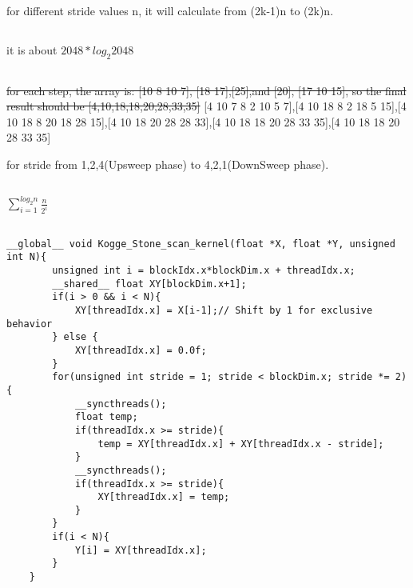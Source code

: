 \documentclass{article}
\begin{document}
\subsection{}
for different stride values n, it will calculate from (2k-1)n to (2k)n.

\subsection{}
it is about $2048*log_{2}2048$

\subsection{}
\sout{for each step, the array is: [10 8 10 7], [18 17],[25],and [20], [17 10 15], so the final result should be [4,10,18,18,20,28,33,35]}
[4 10 7 8 2 10 5 7],[4 10 18 8 2 18 5 15],[4 10 18 8 20 18 28 15],[4 10 18 20 28 28 33],[4 10 18 18 20 28 33 35],[4 10 18 18 20 28 33 35]

for stride from 1,2,4(Upsweep phase) to 4,2,1(DownSweep phase).

\subsection{}
\(\sum_{i=1}^{log_{2}n}\frac{n}{2^{i}}\)

\subsection{}
\begin{lstlisting}[basicstyle=\small\ttfamily, breaklines=true]
    __global__ void Kogge_Stone_scan_kernel(float *X, float *Y, unsigned int N){
        unsigned int i = blockIdx.x*blockDim.x + threadIdx.x;
        __shared__ float XY[blockDim.x+1];
        if(i > 0 && i < N){
            XY[threadIdx.x] = X[i-1];// Shift by 1 for exclusive behavior
        } else {
            XY[threadIdx.x] = 0.0f;
        }
        for(unsigned int stride = 1; stride < blockDim.x; stride *= 2){
            __syncthreads();
            float temp;
            if(threadIdx.x >= stride){
                temp = XY[threadIdx.x] + XY[threadIdx.x - stride];
            }
            __syncthreads();
            if(threadIdx.x >= stride){
                XY[threadIdx.x] = temp;
            }
        }
        if(i < N){
            Y[i] = XY[threadIdx.x];
        }
    }
\end{lstlisting}
\end{document}
